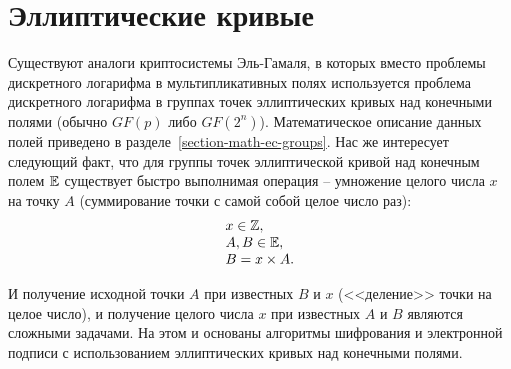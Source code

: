 \section{Эллиптические кривые}\label{section-elliptic-curve-cryptosystems}

Существуют аналоги криптосистемы Эль-Гамаля, в которых вместо проблемы дискретного логарифма в мультипликативных полях используется проблема дискретного логарифма в группах точек эллиптических кривых над конечными полями (обычно $GF(p)$ либо $GF(2^n)$). Математическое описание данных полей приведено в разделе~\ref{section-math-ec-groups}. Нас же интересует следующий факт, что для группы точек эллиптической кривой над конечным полем $\mathbb{E}$ существует быстро выполнимая операция -- умножение целого числа $x$ на точку $A$ (суммирование точки с самой собой целое число раз):
\[ \begin{array}{l}
	x \in \mathbb{Z}, \\
	A, B \in \mathbb{E}, \\
	B = x \times A. \\
\end{array} \]

И получение исходной точки $A$ при известных $B$ и $x$ (<<деление>> точки на целое число), и получение целого числа $x$ при известных $A$ и $B$ являются сложными задачами. На этом и основаны алгоритмы шифрования и электронной подписи с использованием эллиптических кривых над конечными полями.




